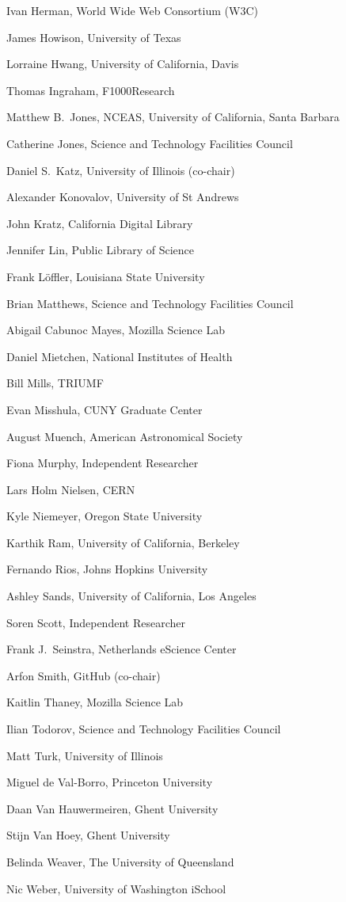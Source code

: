 \documentclass[11pt, oneside]{amsart}
\begin{document}
Ivan Herman, World Wide Web Consortium (W3C)

James Howison, University of Texas

Lorraine Hwang, University of California,  Davis

Thomas Ingraham, F1000Research

Matthew B.~Jones, NCEAS, University of California,  Santa Barbara

Catherine Jones, Science and Technology Facilities Council

Daniel S.~Katz, University of Illinois (co-chair)

Alexander Konovalov, University of St Andrews

John Kratz, California Digital Library

Jennifer Lin, Public Library of Science

Frank L\"offler, Louisiana State University

Brian Matthews, Science and Technology Facilities Council

Abigail Cabunoc Mayes, Mozilla Science Lab

Daniel Mietchen, National Institutes of Health

Bill Mills, TRIUMF

Evan Misshula, CUNY Graduate Center

August Muench, American Astronomical Society

Fiona Murphy, Independent Researcher

Lars Holm Nielsen, CERN

Kyle Niemeyer, Oregon State University

Karthik Ram, University of California, Berkeley

Fernando Rios, Johns Hopkins University

Ashley Sands, University of California, Los Angeles

Soren Scott, Independent Researcher

Frank J.~Seinstra, Netherlands eScience Center

Arfon Smith, GitHub (co-chair)

Kaitlin Thaney, Mozilla Science Lab

Ilian Todorov, Science and Technology Facilities Council

Matt Turk, University of Illinois

Miguel de Val-Borro, Princeton University

Daan Van Hauwermeiren, Ghent University

Stijn Van Hoey, Ghent University

Belinda Weaver, The University of Queensland

Nic Weber, University of Washington iSchool



\end{document}
